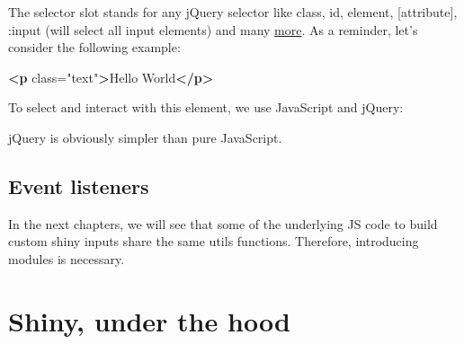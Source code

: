 \documentclass[]{book}
\newenvironment{Shaded}{\begin{snugshade}}{\end{snugshade}}
\newcommand{\AttributeTok}[1]{\textcolor[rgb]{0.77,0.63,0.00}{#1}}
\newcommand{\CommentTok}[1]{\textcolor[rgb]{0.56,0.35,0.01}{\textit{#1}}}
\newcommand{\KeywordTok}[1]{\textcolor[rgb]{0.13,0.29,0.53}{\textbf{#1}}}
\newcommand{\NormalTok}[1]{#1}
\newcommand{\OperatorTok}[1]{\textcolor[rgb]{0.81,0.36,0.00}{\textbf{#1}}}
\newcommand{\OtherTok}[1]{\textcolor[rgb]{0.56,0.35,0.01}{#1}}
\newcommand{\StringTok}[1]{\textcolor[rgb]{0.31,0.60,0.02}{#1}}
\newcommand{\VariableTok}[1]{\textcolor[rgb]{0.00,0.00,0.00}{#1}}
\begin{document}
\begin{Shaded}
\end{Shaded}

The selector slot stands for any jQuery selector like class, id, element, {[}attribute{]}, :input (will select all input elements) and many \href{https://www.w3schools.com/jquery/jquery_ref_selectors.asp}{more}. As a reminder, let's consider the following example:

\begin{Shaded}
\begin{Highlighting}[]
\KeywordTok{<p}\OtherTok{ class=}\StringTok{"text"}\KeywordTok{>}\NormalTok{Hello World}\KeywordTok{</p>}
\end{Highlighting}
\end{Shaded}

To select and interact with this element, we use JavaScript and jQuery:

\begin{Shaded}
\end{Shaded}

jQuery is obviously simpler than pure JavaScript.

\hypertarget{event-listeners}{%
\section{Event listeners}\label{event-listeners}}

In the next chapters, we will see that some of the underlying JS code to build custom shiny inputs share the same utils functions. Therefore, introducing modules is necessary.

\hypertarget{survival-kit-shiny}{%
\chapter{Shiny, under the hood}\label{survival-kit-shiny}}
\end{document}
